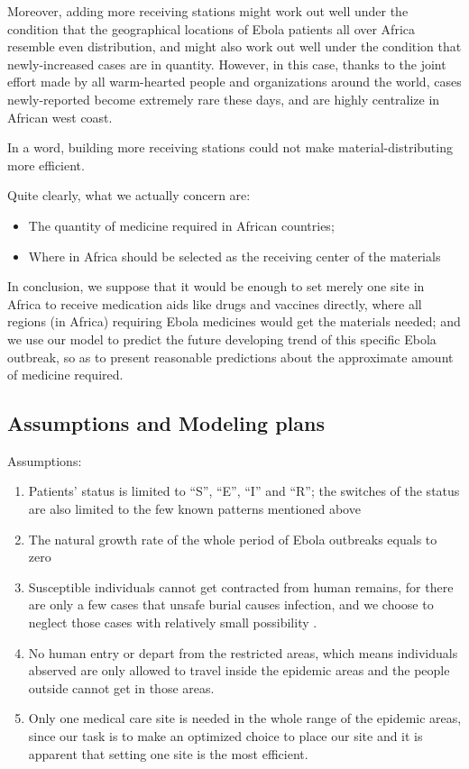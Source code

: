 \documentclass[11pt]{article}
\begin{document}
Moreover, adding more receiving stations might work out well under the condition that the geographical locations of Ebola patients all over Africa resemble even distribution, and might also work out well under the condition that newly-increased cases are in quantity. However, in this case, thanks to the joint effort made by all warm-hearted people and organizations around the world, cases newly-reported become extremely rare these days, and are highly centralize in African west coast.

In a word, building more receiving stations could not make material-distributing more efficient.

Quite clearly, what we actually concern are:

\begin{itemize}
\item The quantity of medicine required in African countries;
\item Where in Africa should be selected as the receiving center of the materials
\end{itemize}

In conclusion, we suppose that it would be enough to set merely one site in Africa to receive medication aids like drugs and vaccines directly, where all regions (in Africa) requiring Ebola medicines would get the materials needed; and we use our model to predict the future developing trend of this specific Ebola outbreak, so as to present reasonable predictions about the approximate amount of medicine required.

\subsection{Assumptions and Modeling plans}
Assumptions: 
\begin{enumerate}
\item Patients' status is limited to ``S'', ``E'', ``I'' and ``R''; the switches of the status are also limited to the few known patterns mentioned above
\item The natural growth rate of the whole period of Ebola outbreaks equals to zero
\item Susceptible individuals cannot get contracted from human remains, for there are only a few cases that unsafe burial causes infection, and we choose to neglect those cases with relatively small possibility \cite{Sitrep}.
\item No human entry or depart from the restricted areas, which means individuals abserved are only allowed to travel inside the epidemic areas and the people outside cannot get in those areas.
\item Only one medical care site is needed in the whole range of the epidemic areas, since our task is to make an optimized choice to place our site and it is apparent that setting one site is the most efficient.
\end{enumerate}
 
\end{document}
